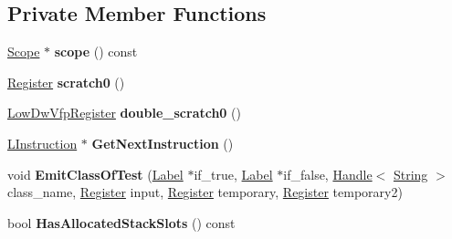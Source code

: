 \subsection*{Private Member Functions}
\begin{DoxyCompactItemize}
\item 
\hyperlink{classv8_1_1internal_1_1_scope}{Scope} $\ast$ {\bfseries scope} () const \hypertarget{classv8_1_1internal_1_1_l_code_gen_a2b85c964ccc4e59f50d49d19b0ed5ce0}{}\label{classv8_1_1internal_1_1_l_code_gen_a2b85c964ccc4e59f50d49d19b0ed5ce0}

\item 
\hyperlink{structv8_1_1internal_1_1_register}{Register} {\bfseries scratch0} ()\hypertarget{classv8_1_1internal_1_1_l_code_gen_a9ebee5eebe5fb0c13a6830fc3a0d96d5}{}\label{classv8_1_1internal_1_1_l_code_gen_a9ebee5eebe5fb0c13a6830fc3a0d96d5}

\item 
\hyperlink{structv8_1_1internal_1_1_low_dw_vfp_register}{Low\+Dw\+Vfp\+Register} {\bfseries double\+\_\+scratch0} ()\hypertarget{classv8_1_1internal_1_1_l_code_gen_a6878bb43cbdc770fd19089e8747d03d4}{}\label{classv8_1_1internal_1_1_l_code_gen_a6878bb43cbdc770fd19089e8747d03d4}

\item 
\hyperlink{classv8_1_1internal_1_1_l_instruction}{L\+Instruction} $\ast$ {\bfseries Get\+Next\+Instruction} ()\hypertarget{classv8_1_1internal_1_1_l_code_gen_a3089f4ba7e1cc640f81ca419fb0d39fa}{}\label{classv8_1_1internal_1_1_l_code_gen_a3089f4ba7e1cc640f81ca419fb0d39fa}

\item 
void {\bfseries Emit\+Class\+Of\+Test} (\hyperlink{classv8_1_1internal_1_1_label}{Label} $\ast$if\+\_\+true, \hyperlink{classv8_1_1internal_1_1_label}{Label} $\ast$if\+\_\+false, \hyperlink{classv8_1_1internal_1_1_handle}{Handle}$<$ \hyperlink{classv8_1_1internal_1_1_string}{String} $>$ class\+\_\+name, \hyperlink{structv8_1_1internal_1_1_register}{Register} input, \hyperlink{structv8_1_1internal_1_1_register}{Register} temporary, \hyperlink{structv8_1_1internal_1_1_register}{Register} temporary2)\hypertarget{classv8_1_1internal_1_1_l_code_gen_aae86e9c7161b47dc83e86e0ef0402a43}{}\label{classv8_1_1internal_1_1_l_code_gen_aae86e9c7161b47dc83e86e0ef0402a43}

\item 
bool {\bfseries Has\+Allocated\+Stack\+Slots} () const \hypertarget{classv8_1_1internal_1_1_l_code_gen_a6a5091a94d97298722ad3509d6fa41ab}{}\label{classv8_1_1internal_1_1_l_code_gen_a6a5091a94d97298722ad3509d6fa41ab}


\end{DoxyCompactItemize}
